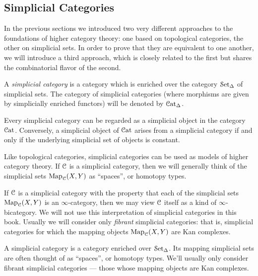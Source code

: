 \subsection{Simplicial Categories}\label{compp1}
\begin{1.1.4 Simplicial Categories}
In the previous sections we introduced two very different approaches to the foundations of higher category theory: one based on topological categories, the other on simplicial sets. In order to prove that they are equivalent to one another, we will introduce a third approach,  which is closely related to the first but shares the combinatorial flavor of the second.

\begin{definition}
A {\it simplicial category} is a category which is enriched over
the category $\operatorname{\mathcal{S}et_{\Delta}}$ of simplicial sets. The category of simplicial
categories (where morphisms are given by simplicially enriched functors) will be
denoted by $\operatorname{\mathcal{C}at_{\Delta}}$.
\end{definition}

\begin{remark}
Every simplicial category can be regarded as a simplicial object in the category $\operatorname{\mathcal{C}at}$. Conversely, a simplicial object of $\operatorname{\mathcal{C}at}$ arises from a simplicial category if and only if the underlying simplicial set of objects is constant.
\end{remark}

Like topological categories, simplicial categories can be used as models of higher category theory. If $\operatorname{\mathcal{C}}$ is a simplicial category, then we will generally think of the simplicial sets $\operatorname{{Map}}_{\operatorname{\mathcal{C}}}(X,Y)$ as ``spaces'', or homotopy types. 

\begin{remark}
If $\operatorname{\mathcal{C}}$ is a simplicial category with the property that each of the simplicial sets
$\operatorname{{Map}}_{\operatorname{\mathcal{C}}}(X,Y)$ is an $\infty$-category, then we may view $\operatorname{\mathcal{C}}$ itself as a kind of $\infty$-bicategory. We will not use this interpretation of simplicial categories in this book. Usually we will consider only {\em fibrant} simplicial categories: that is, simplicial categories for which the mapping objects $\operatorname{{Map}}_{\operatorname{\mathcal{C}}}(X,Y)$ are Kan complexes.
\end{remark}
\begin{shaded}
A simplicial category is a category enriched over $\operatorname{\mathcal{S}et_{\Delta}}$. Its mapping simplicial sets are often thought of as ``spaces'', or homotopy types. We'll usually only consider fibrant simplicial categories --- those whose mapping objects are Kan complexes.
\end{shaded}


\end{1.1.4 Simplicial Categories}
